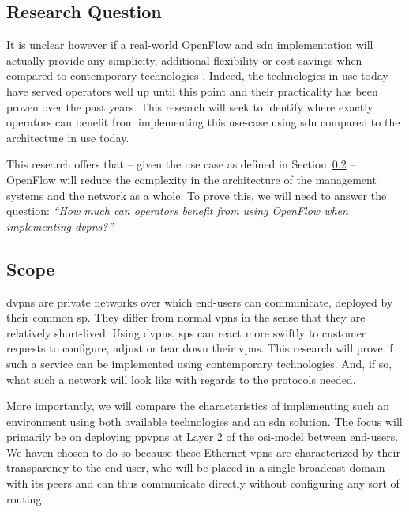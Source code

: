 	\subsection{Research Question} %
	\label{sub:research_question}
	It is unclear however if a real-world OpenFlow and \ac{sdn} implementation will actually provide any simplicity, additional flexibility or cost savings when compared to contemporary technologies \cite{programmability-answer}. Indeed, the technologies in use today have served operators well up until this point and their practicality has been proven over the past years. 
	This research will seek to identify where exactly operators can benefit from implementing this use-case using \ac{sdn} compared to the architecture in use today. 
	
	This research offers that -- given the use case as defined in Section~\ref{sub:scope} -- OpenFlow will reduce the complexity in the architecture of the management systems and the network as a whole. 
	To prove this, we will need to answer the question: \textsl{``How much can operators benefit from using OpenFlow when implementing \aclp{dvpn}?''} 
	


	\subsection{Scope} %
	\label{sub:scope}
	\acp{dvpn} are private networks over which end-users can communicate, deployed by their common \ac{sp}. They differ from normal \acp{vpn} in the sense that they are relatively short-lived. Using \acp{dvpn}, \acp{sp} can react more swiftly to customer requests to configure, adjust or tear down their \acp{vpn}.
	This research will prove if such a service can be implemented using contemporary technologies. And, if so, what such a network will look like with regards to the protocols needed.
	
	 More importantly, we will compare the characteristics of implementing such an environment using both available technologies and an \ac{sdn} solution. 
	The focus will primarily be on deploying \acp{ppvpn} at Layer 2 of the \acs{osi}-model between end-users. We haven chosen to do so because these Ethernet \acp{vpn} are characterized by their transparency to the end-user, who will be placed in a single broadcast domain with its peers and can thus communicate directly without configuring any sort of routing.
	

